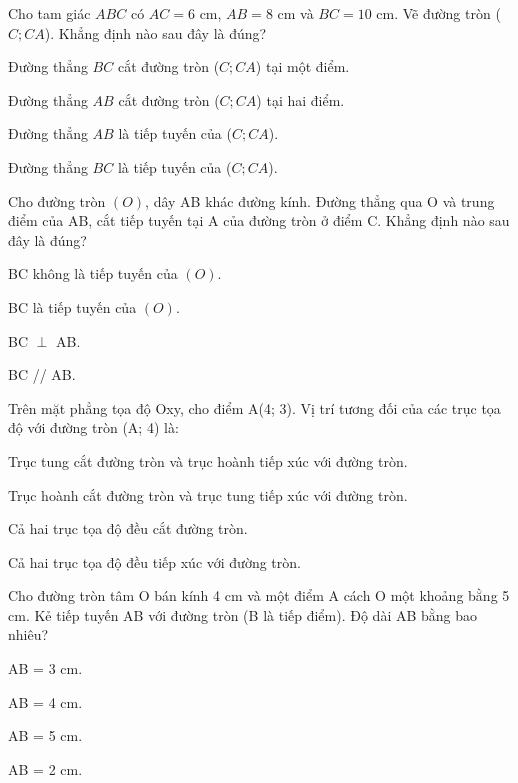 \documentclass[%
    fontsize=12pt,%
    chapterprefix=false,%
    open=right,%
    twoside=false,%
    numbers=noenddot,%
    headings=optiontohead,%
    final,%
    DIV=15,%
    parskip=half %
]{scrbook}
\begin{document}
\begin{tracnghiem}
\item Cho tam giác $ABC$ có $AC = 6$ cm, $AB = 8$ cm và $BC = 10$ cm. Vẽ đường tròn ($C; CA$). Khẳng định nào sau đây là đúng?
\begin{options}
  \item Đường thẳng $BC$ cắt đường tròn ($C; CA$) tại một điểm.
  \item Đường thẳng $AB$ cắt đường tròn ($C; CA$) tại hai điểm.
  \item Đường thẳng $AB$ là tiếp tuyến của ($C; CA$).
  \item Đường thẳng $BC$ là tiếp tuyến của ($C; CA$).
\end{options}

\item Cho đường tròn $(O)$, dây AB khác đường kính. Đường thẳng qua O và trung điểm của AB, cắt tiếp tuyến tại A của đường tròn ở điểm C. Khẳng định nào sau đây là đúng?
\begin{options}
  \item BC không là tiếp tuyến của $(O)$.
  \item BC là tiếp tuyến của $(O)$.
  \item BC $\perp$ AB.
  \item BC // AB.
\end{options}

\item Trên mặt phẳng tọa độ Oxy, cho điểm A(4; 3). Vị trí tương đối của các trục tọa độ với đường tròn (A; 4) là:
\begin{options}
  \item Trục tung cắt đường tròn và trục hoành tiếp xúc với đường tròn.
  \item Trục hoành cắt đường tròn và trục tung tiếp xúc với đường tròn.
  \item Cả hai trục tọa độ đều cắt đường tròn.
  \item Cả hai trục tọa độ đều tiếp xúc với đường tròn.
\end{options}

\item Cho đường tròn tâm O bán kính 4 cm và một điểm A cách O một khoảng bằng 5 cm. Kẻ tiếp tuyến AB với đường tròn (B là tiếp điểm). Độ dài AB bằng bao nhiêu?
\begin{options}
  \item AB = 3 cm.
  \item AB = 4 cm.
  \item AB = 5 cm.
  \item AB = 2 cm.
\end{options}


\end{tracnghiem}
\end{document}
